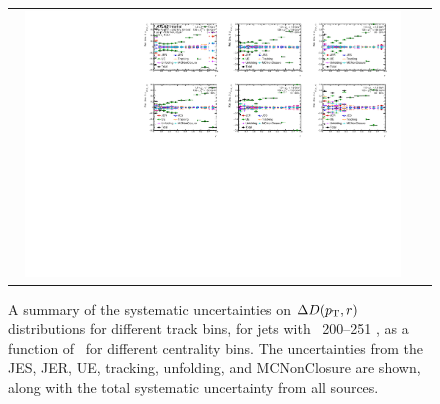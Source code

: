 \begin{figure}
{\begin{tabular}{cc}
	 \includegraphics[page=19, width=0.95\textwidth]{figures_systematics/Summary_DeltaDpT_dR_sys_error} \\
\end{tabular} }
   \caption{A summary of the systematic uncertainties on $\Delta\mbox{$D( p_{\mathrm{T}}, r)$}$ distributions for different track \pt bins, for jets with \pt\ 200--251  \GeV, as a function of \rvar\ for different centrality bins. The uncertainties from the JES, JER, UE, tracking, unfolding, and MCNonClosure are shown, along with the total systematic uncertainty from all sources. }
      \label{fig:deltadptr_sys_uncert_A2}
\end{figure}

